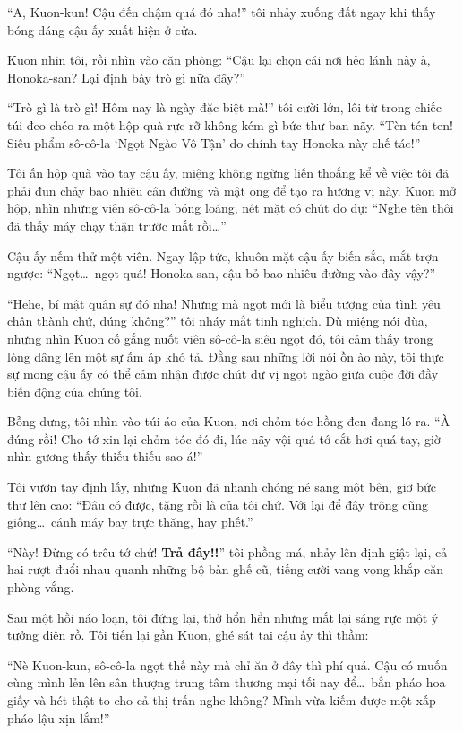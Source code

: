 \documentclass[../main.tex]{subfiles}
\begin{document}
``A, Kuon-kun! Cậu đến chậm quá đó nha!'' tôi nhảy xuống đất ngay khi thấy bóng dáng cậu ấy xuất hiện ở cửa.

Kuon nhìn tôi, rồi nhìn vào căn phòng: ``Cậu lại chọn cái nơi hẻo lánh này à, Honoka-san? Lại định bày trò gì nữa đây?''

``Trò gì là trò gì! Hôm nay là ngày đặc biệt mà!'' tôi cười lớn, lôi từ trong chiếc túi đeo chéo ra một hộp quà rực rỡ không kém gì bức thư ban nãy. ``Tèn tén ten! Siêu phẩm sô-cô-la `Ngọt Ngào Vô Tận' do chính tay Honoka này chế tác!''

Tôi ấn hộp quà vào tay cậu ấy, miệng không ngừng liến thoắng kể về việc tôi đã phải đun chảy bao nhiêu cân đường và mật ong để tạo ra hương vị này. Kuon mở hộp, nhìn những viên sô-cô-la bóng loáng, nét mặt có chút do dự: ``Nghe tên thôi đã thấy máy chạy thận trước mắt rồi\dots''

Cậu ấy nếm thử một viên. Ngay lập tức, khuôn mặt cậu ấy biến sắc, mắt trợn ngược: ``Ngọt\dots\ ngọt quá! Honoka-san, cậu bỏ bao nhiêu đường vào đây vậy?''

``Hehe, bí mật quân sự đó nha! Nhưng mà ngọt mới là biểu tượng của tình yêu chân thành chứ, đúng không?'' tôi nháy mắt tinh nghịch. Dù miệng nói đùa, nhưng nhìn Kuon cố gắng nuốt viên sô-cô-la siêu ngọt đó, tôi cảm thấy trong lòng dâng lên một sự ấm áp khó tả. Đằng sau những lời nói ồn ào này, tôi thực sự mong cậu ấy có thể cảm nhận được chút dư vị ngọt ngào giữa cuộc đời đầy biến động của chúng tôi.

Bỗng dưng, tôi nhìn vào túi áo của Kuon, nơi chỏm tóc hồng-đen đang ló ra. ``À đúng rồi! Cho tớ xin lại chỏm tóc đó đi, lúc nãy vội quá tớ cắt hơi quá tay, giờ nhìn gương thấy thiếu thiếu sao á!''

Tôi vươn tay định lấy, nhưng Kuon đã nhanh chóng né sang một bên, giơ bức thư lên cao: ``Đâu có được, tặng rồi là của tôi chứ. Với lại để đây trông cũng giống\dots\ cánh máy bay trực thăng, hay phết.''

``Này! Đừng có trêu tớ chứ! \textbf{Trả đây!!}'' tôi phồng má, nhảy lên định giật lại, cả hai rượt đuổi nhau quanh những bộ bàn ghế cũ, tiếng cười vang vọng khắp căn phòng vắng.

Sau một hồi náo loạn, tôi đứng lại, thở hổn hển nhưng mắt lại sáng rực một ý tưởng điên rồ. Tôi tiến lại gần Kuon, ghé sát tai cậu ấy thì thầm:

``Nè Kuon-kun, sô-cô-la ngọt thế này mà chỉ ăn ở đây thì phí quá. Cậu có muốn cùng mình lẻn lên sân thượng trung tâm thương mại tối nay để\dots\ bắn pháo hoa giấy và hét thật to cho cả thị trấn nghe không? Mình vừa kiếm được một xấp pháo lậu xịn lắm!''
\end{document}
